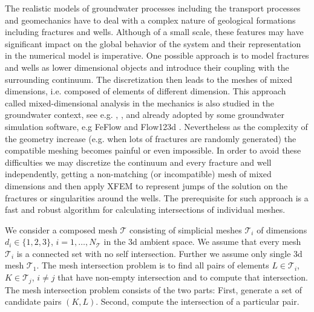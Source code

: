 \documentclass{elsarticle}
\begin{document}
The realistic models of groundwater processes including the transport processes and geomechanics have to deal with 
a complex nature of geological formations including fractures and wells. Although of a small scale, these features may have significant impact 
on the global behavior of the system and their representation in the numerical model is imperative.
One possible approach is to model fractures and wells as lower dimensional objects and introduce their coupling with the surrounding continuum. 
The discretization then leads to the meshes of mixed dimensions, i.e. composed of elements of different dimension. This approach 
called mixed-dimensional analysis in the mechanics \cite{bournival_mesh-geometry_2008} is also studied in the groundwater context, see e.g. 
\cite{martin_modeling_2005}, \cite{fumagalli_numerical_2011}, \cite{brezina_analysis_2015} and 
already adopted by some groundwater simulation software, e.g FeFlow \cite{trefry_feflow:_2007} and Flow123d \cite{flow123d}.
Nevertheless as the complexity of the geometry increase (e.g. when lots of fractures are randomly generated) the compatible meshing becomes painful or even 
impossible. In order to avoid these difficulties we may discretize the continuum and every fracture and well independently, getting a non-matching 
(or incompatible) mesh of mixed dimensions and then apply XFEM to represent jumps of the solution on the fractures or singularities 
around the wells. The prerequisite for such approach is a fast and robust algorithm for calculating intersections of individual meshes.

We consider a composed mesh $\mathcal T$ consisting of simplicial meshes $\mathcal T_i$ of dimensions $d_i \in \{1,2,3\}$, $i=1,\dots,N_\mathcal{T}$
in the 3d ambient space. We assume that every mesh $\mathcal T_i$ is a connected set with no self intersection.
Further we assume only single 3d mesh $\mathcal{T}_1$.
The mesh intersection problem is to find all pairs of elements $L\in \mathcal{T}_i$, $K\in \mathcal{T}_j$, $i\ne j$ that have non-empty intersection 
and to compute that intersection. The mesh intersection problem consists of the two parts: First, generate a set of candidate pairs $(K, L)$. 
Second, compute the intersection of a particular pair.
\end{document}
